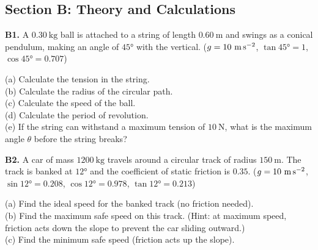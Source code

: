 \begin{exercisebox}[6]
\subsection*{Section B: Theory and Calculations}

\textbf{B1.} A $0.30\ \text{kg}$ ball is attached
to a string of length $0.60\ \text{m}$ and swings
as a conical pendulum, making an angle of $45°$ with
the vertical. ($g = 10\ \text{m\,s}^{-2}$,
$\tan 45° = 1$, $\cos 45° = 0.707$)\\[4pt]
\begin{center}
\end{center}
(a) Calculate the tension in the string.\\
(b) Calculate the radius of the circular path.\\
(c) Calculate the speed of the ball.\\
(d) Calculate the period of revolution.\\
(e) If the string can withstand a maximum tension
of $10\ \text{N}$, what is the maximum angle
$\theta$ before the string breaks?
\hfill{}

\vspace{0.4cm}

\textbf{B2.} A car of mass $1200\ \text{kg}$ travels
around a circular track of radius $150\ \text{m}$.
The track is banked at $12°$ and the coefficient of
static friction is $0.35$. ($g = 10\ \text{m\,s}^{-2}$,
$\sin 12° = 0.208$, $\cos 12° = 0.978$,
$\tan 12° = 0.213$)\\[4pt]
\begin{center}
\end{center}
(a) Find the ideal speed for the banked track
(no friction needed).\\
(b) Find the maximum safe speed on this track.
(Hint: at maximum speed, friction acts down the slope
to prevent the car sliding outward.)\\
(c) Find the minimum safe speed
(friction acts up the slope).
\hfill{}


\end{exercisebox}
